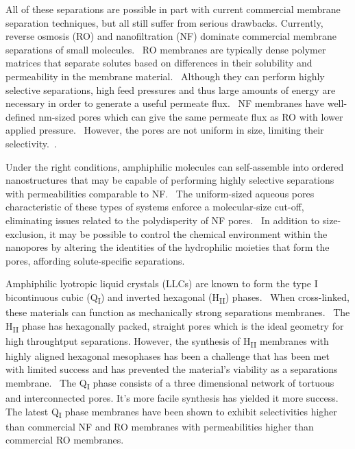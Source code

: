 \documentclass[journal=jpcbfk,manuscript=article]{achemso}
\begin{document}
  All of these separations are possible in part with current commercial
  membrane separation techniques, but all still suffer from serious drawbacks.
  Currently, reverse osmosis (RO) and nanofiltration (NF) dominate commercial
  membrane separations of small molecules.~\cite{warsinger_review_2018} RO
  membranes are typically dense polymer matrices that separate solutes based on
  differences in their solubility and permeability in the membrane
  material.~\cite{fritzmann_state---art_2007} Although they can perform highly
  selective separations, high feed pressures and thus large amounts of energy are
  necessary in order to generate a useful permeate
  flux.~\cite{van_der_bruggen_review_2003} NF membranes have well-defined
  nm-sized pores which can give the same permeate flux as RO with lower applied
  pressure.~\cite{hilal_comprehensive_2004} However, the pores are not uniform in
  size, limiting their selectivity.~\cite{werber_materials_2016}.

  Under the right conditions, amphiphilic molecules can self-assemble into
  ordered nanostructures that may be capable of performing highly selective
  separations with permeabilities comparable to
  NF.~\cite{alexandridis_amphiphilic_2000} The uniform-sized aqueous pores
  characteristic of these types of systems enforce a molecular-size cut-off,
  eliminating issues related to the polydisperity of NF
  pores.~\cite{zhou_supported_2005} In addition to size-exclusion, it may be
  possible to control the chemical environment within the nanopores by altering
  the identities of the hydrophilic moieties that form the pores, affording
  solute-specific separations.~\cite{dischinger_effect_2017}

  Amphiphilic lyotropic liquid crystals (LLCs) are known to form the type I
  bicontinuous cubic (Q\textsubscript{I}) and inverted hexagonal (H\textsubscript{II})
  phases.~\cite{smith_ordered_1997,dischinger_application_2017,carter_glycerol-based_2012,hatakeyama_nanoporous_2010}
  When cross-linked, these materials can function as mechanically strong
  separations membranes.~\cite{zhou_supported_2005} The H\textsubscript{II} phase
  has hexagonally packed, straight pores which is the ideal geometry for high
  throughtput separations. However, the synthesis of H\textsubscript{II}
  membranes with highly aligned hexagonal mesophases has been a challenge that
  has been met with limited success and has prevented the material's viability as
  a separations membrane.~\cite{feng_scalable_2014,feng_thin_2016} The
  Q\textsubscript{I} phase consists of a three dimensional network of tortuous
  and interconnected pores.  It's more facile synthesis has yielded it more
  success. The latest Q\textsubscript{I} phase membranes have been shown to
  exhibit selectivities higher than commercial NF and RO membranes with permeabilities
  higher than commercial RO membranes.~\cite{dischinger_application_2017}
\end{document}
